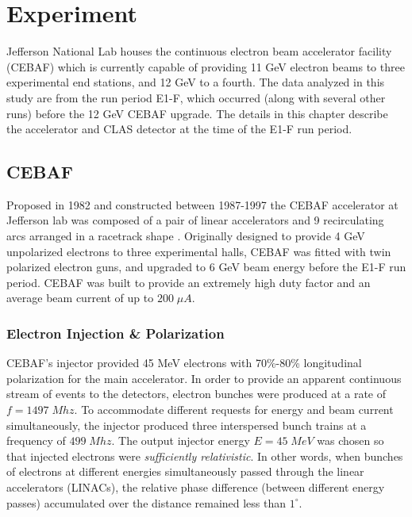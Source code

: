 \chapter{Experiment}
Jefferson National Lab houses the continuous electron beam accelerator facility (CEBAF) which is currently capable of providing 11 GeV electron beams to three experimental end stations, and 12 GeV to a fourth.  The data analyzed in this study are from the run period E1-F, which occurred (along with several other runs) before the 12 GeV CEBAF upgrade.  The details in this chapter describe the accelerator and CLAS detector at the time of the E1-F run period.  \\

\section{CEBAF} 
Proposed in 1982 and constructed between 1987-1997 the CEBAF accelerator at Jefferson lab was composed of a pair of linear accelerators and 9 recirculating arcs arranged in a racetrack shape \cite{hardware-leemann:2001, hardware-chao:2011}.  Originally designed to provide 4 GeV unpolarized electrons to three experimental halls, CEBAF was fitted with twin polarized electron guns, and upgraded to 6 GeV beam energy before the E1-F run period.  CEBAF was built to provide an extremely high duty factor and an average beam current of up to $200 \; \mu A$.\\


\subsection{Electron Injection \& Polarization}
CEBAF's injector provided 45 MeV electrons with 70\%-80\% longitudinal polarization for the main accelerator.  In order to provide an apparent continuous stream of events to the detectors, electron bunches were produced at a rate of $f = 1497 \; Mhz$.  To accommodate different requests for energy and beam current simultaneously, the injector produced three interspersed bunch trains at a frequency of $499 \; Mhz$.  The output injector energy $E = 45 \; MeV$ was chosen so that injected electrons were \textit{sufficiently relativistic}.  In other words, when bunches of electrons at different energies simultaneously passed through the linear accelerators (LINACs), the relative phase difference (between different energy passes) accumulated over the distance remained less than $1^\circ$. \\


